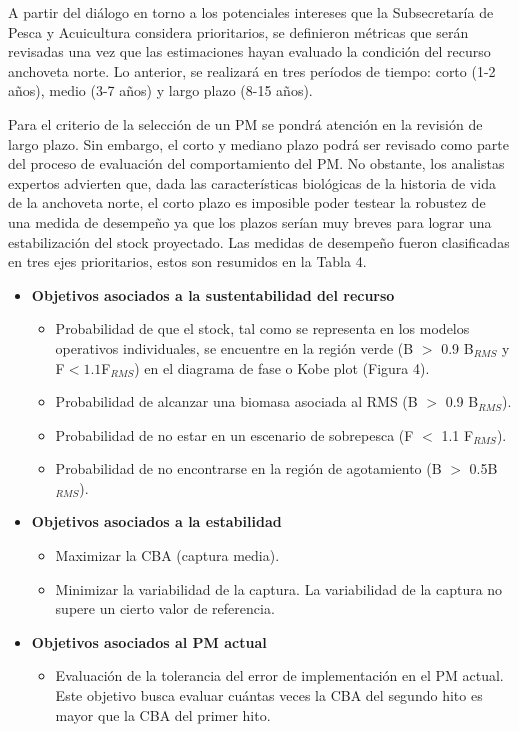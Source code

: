 
A partir del diálogo en torno a los potenciales intereses que la Subsecretaría de Pesca y Acuicultura considera prioritarios, se definieron métricas que serán revisadas una vez que las estimaciones hayan evaluado la condición del recurso anchoveta norte. Lo anterior, se realizará en tres períodos de tiempo: corto (1-2 años), medio (3-7 años) y largo plazo (8-15 años). 

Para el criterio de la selección de un PM se pondrá atención en la revisión de largo plazo. Sin embargo, el corto y mediano plazo podrá ser revisado como parte del proceso de evaluación del comportamiento del PM. No obstante, los analistas expertos advierten que, dada las características biológicas de la historia de vida de la anchoveta norte, el corto plazo es imposible poder testear la robustez de una medida de desempeño ya que los plazos serían muy breves para lograr una estabilización del stock proyectado. Las medidas de desempeño fueron clasificadas en tres ejes prioritarios, estos son resumidos en la Tabla 4.

\begin{itemize}
    \item \textbf{Objetivos asociados a la sustentabilidad del recurso}
    \begin{itemize}
        \item Probabilidad de que el stock, tal como se representa en los modelos operativos individuales, se encuentre en la región verde (B $>$ 0.9 B$_{RMS}$ y F$<1.1$F$_{RMS}$) en el diagrama de fase o Kobe plot (Figura 4).
        \item Probabilidad de alcanzar una biomasa asociada al RMS (B $>$ 0.9 B$_{RMS}$).
        \item Probabilidad de no estar en un escenario de sobrepesca (F $<$ 1.1 F$_{RMS}$).
        \item Probabilidad de no encontrarse en la región de agotamiento (B $>$ 0.5B$_{RMS}$). 
    \end{itemize} 
    \item \textbf{Objetivos asociados a la estabilidad}
    \begin{itemize}
        \item Maximizar la CBA (captura media).
        \item Minimizar la variabilidad de la captura. La variabilidad de la captura no supere un cierto valor de referencia. 
    \end{itemize}
    \item \textbf{Objetivos asociados al PM actual}
    \begin{itemize}
        \item Evaluación de la tolerancia del error de implementación en el PM actual. Este objetivo busca evaluar cuántas veces la CBA del segundo hito es mayor que la CBA del primer hito.
    \end{itemize}
\end{itemize}

